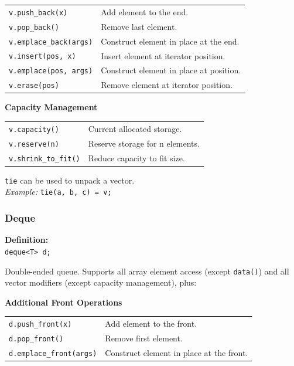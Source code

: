 \begin{tabularx}{\linewidth}{lX}
\texttt{v.push\_back(x)} & Add element to the end.\\
\texttt{v.pop\_back()} & Remove last element.\\
\texttt{v.emplace\_back(args)} & Construct element in place at the end.\\
\texttt{v.insert(pos, x)} & Insert element at iterator position.\\
\texttt{v.emplace(pos, args)} & Construct element in place at position.\\
\texttt{v.erase(pos)} & Remove element at iterator position.\\
\end{tabularx}

\textbf{Capacity Management}

\begin{tabularx}{\linewidth}{lX}
\texttt{v.capacity()} & Current allocated storage.\\
\texttt{v.reserve(n)} & Reserve storage for n elements.\\
\texttt{v.shrink\_to\_fit()} & Reduce capacity to fit size.\\
\end{tabularx}

\vspace*{8pt}
\texttt{tie} can be used to unpack a vector.\\
\textit{Example:} \texttt{tie(a, b, c) = v;}


\vfill \null
\columnbreak


\subsubsection{Deque}

\textbf{Definition:}\\
\texttt{deque<T> d;}

Double-ended queue. Supports all array element access (except \texttt{data()}) and all vector modifiers (except capacity management), plus:

\textbf{Additional Front Operations}

\begin{tabularx}{\linewidth}{lX}
\texttt{d.push\_front(x)} & Add element to the front.\\
\texttt{d.pop\_front()} & Remove first element.\\
\texttt{d.emplace\_front(args)} & Construct element in place at the front.\\
\end{tabularx}
